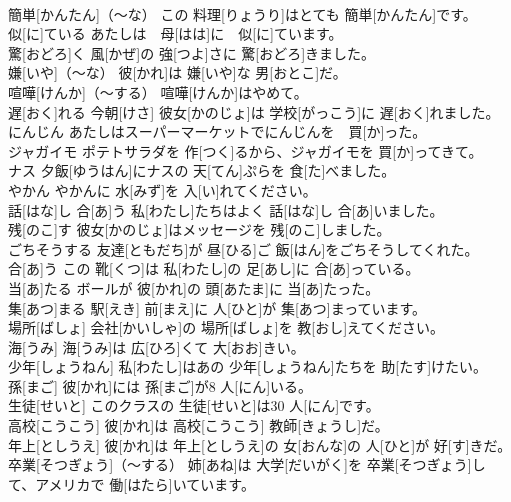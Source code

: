\documentclass[8pt]{extreport}
\begin{document}
\begin{CJK}{UTF8}{min}
\\	簡単[かんたん]（～な）	この 料理[りょうり]はとても 簡単[かんたん]です。		
\\	似[に]ている	あたしは　母[はは]に　似[に]ています。		
\\	驚[おどろ]く	風[かぜ]の 強[つよ]さに 驚[おどろ]きました。		
\\	嫌[いや]（～な）	彼[かれ]は 嫌[いや]な 男[おとこ]だ。		
\\	喧嘩[けんか]（～する）	喧嘩[けんか]はやめて。		
\\	遅[おく]れる	今朝[けさ] 彼女[かのじょ]は 学校[がっこう]に 遅[おく]れました。		
\\	にんじん	あたしはスーパーマーケットでにんじんを　買[か]った。		
\\	ジャガイモ	ポテトサラダを 作[つく]るから、ジャガイモを 買[か]ってきて。		
\\	ナス	夕飯[ゆうはん]にナスの 天[てん]ぷらを 食[た]べました。		
\\	やかん	やかんに 水[みず]を 入[い]れてください。		
\\	話[はな]し 合[あ]う	私[わたし]たちはよく 話[はな]し 合[あ]いました。		
\\	残[のこ]す	彼女[かのじょ]はメッセージを 残[のこ]しました。		
\\	ごちそうする	友達[ともだち]が 昼[ひる]ご 飯[はん]をごちそうしてくれた。		
\\	合[あ]う	この 靴[くつ]は 私[わたし]の 足[あし]に 合[あ]っている。		
\\	当[あ]たる	ボールが 彼[かれ]の 頭[あたま]に 当[あ]たった。		
\\	集[あつ]まる	駅[えき] 前[まえ]に 人[ひと]が 集[あつ]まっています。		
\\	場所[ばしょ]	会社[かいしゃ]の 場所[ばしょ]を 教[おし]えてください。		
\\	海[うみ]	海[うみ]は 広[ひろ]くて 大[おお]きい。		
\\	少年[しょうねん]	私[わたし]はあの 少年[しょうねん]たちを 助[たす]けたい。		
\\	孫[まご]	彼[かれ]には 孫[まご]が8 人[にん]いる。		
\\	生徒[せいと]	このクラスの 生徒[せいと]は30 人[にん]です。		
\\	高校[こうこう]	彼[かれ]は 高校[こうこう] 教師[きょうし]だ。		
\\	年上[としうえ]	彼[かれ]は 年上[としうえ]の 女[おんな]の 人[ひと]が 好[す]きだ。		
\\	卒業[そつぎょう]（～する）	姉[あね]は 大学[だいがく]を 卒業[そつぎょう]して、アメリカで 働[はたら]いています。		

\end{CJK}
\end{document}
